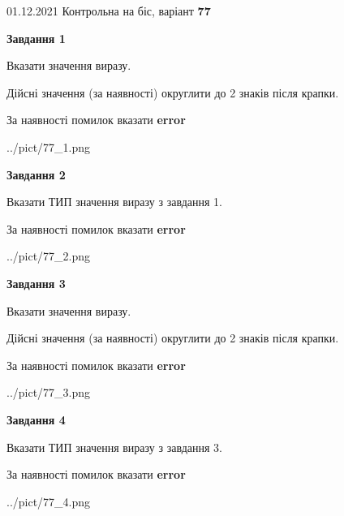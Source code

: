 \documentclass[11pt, ukrainian]{article}
\begin{document}
{01.12.2021 Контрольна на біс, варіант  \No \textbf { 77 }\par}
{
\begin {large}
{\begin {center}\textbf{Завдання 1}\end {center}}\par
Вказати значення виразу. \par
Дійсні значення (за наявності) округлити до 2 знаків після крапки. \par
За наявності помилок вказати \textbf{error}

\begin{center}
	{../pict/77_1.png}
\end{center}
\newpage

{\begin {center}\textbf{Завдання 2}\end {center}}\par
Вказати ТИП значення виразу з завдання 1. \par
За наявності помилок вказати \textbf{error}

\begin{center}
	{../pict/77_2.png}
\end{center}
\newpage

{\begin {center}\textbf{Завдання 3}\end {center}}\par
Вказати значення виразу. \par
Дійсні значення (за наявності) округлити до 2 знаків після крапки. \par
За наявності помилок вказати \textbf{error}

\begin{center}
	{../pict/77_3.png}
\end{center}
\newpage

{\begin {center}\textbf{Завдання 4}\end {center}}\par
Вказати ТИП значення виразу з завдання 3. \par
За наявності помилок вказати \textbf{error}

\begin{center}
	{../pict/77_4.png}
\end{center}
\newpage


\end{large}}
\end{document}
